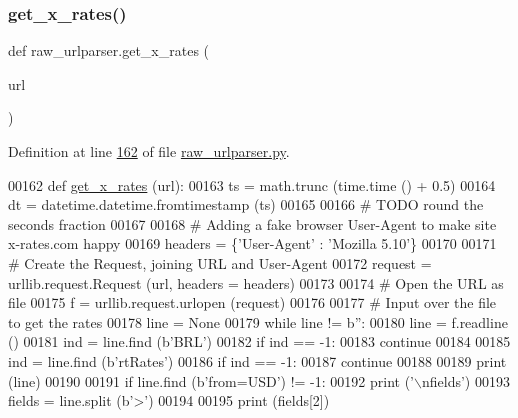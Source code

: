 \subsubsection{\texorpdfstring{get\+\_\+x\+\_\+rates()}{get\_x\_rates()}}
{\footnotesize\ttfamily def raw\+\_\+urlparser.\+get\+\_\+x\+\_\+rates (\begin{DoxyParamCaption}\item[{}]{url }\end{DoxyParamCaption})}



Definition at line \hyperlink{raw__urlparser_8py_source_l00162}{162} of file \hyperlink{raw__urlparser_8py_source}{raw\+\_\+urlparser.\+py}.


\begin{DoxyCode}
00162 \textcolor{keyword}{def }\hyperlink{namespaceraw__urlparser_ab9602b24afd1ae28d96beb085c37410e}{get\_x\_rates} (url):
00163     ts = math.trunc (time.time () + 0.5)
00164     dt = datetime.datetime.fromtimestamp (ts)
00165     
00166     \textcolor{comment}{# TODO round the seconds fraction}
00167     
00168     \textcolor{comment}{# Adding a fake browser User-Agent to make site x-rates.com happy}
00169     headers = \{\textcolor{stringliteral}{'User-Agent'} : \textcolor{stringliteral}{'Mozilla 5.10'}\}
00170         
00171     \textcolor{comment}{# Create the Request, joining URL and User-Agent}
00172     request = urllib.request.Request (url, headers = headers)
00173 
00174     \textcolor{comment}{# Open the URL as file}
00175     f = urllib.request.urlopen (request)
00176     
00177     \textcolor{comment}{# Input over the file to get the rates}
00178     line = \textcolor{keywordtype}{None}
00179     \textcolor{keywordflow}{while} line != b\textcolor{stringliteral}{''}:
00180         line = f.readline ()
00181         ind = line.find (b\textcolor{stringliteral}{'BRL'})
00182         \textcolor{keywordflow}{if} ind == -1:
00183             \textcolor{keywordflow}{continue} 
00184         
00185         ind = line.find (b\textcolor{stringliteral}{'rtRates'})
00186         \textcolor{keywordflow}{if} ind == -1:
00187             \textcolor{keywordflow}{continue} 
00188         
00189         \textcolor{keywordflow}{print} (line)
00190         
00191         \textcolor{keywordflow}{if} line.find (b\textcolor{stringliteral}{'from=USD'}) != -1:
00192             \textcolor{keywordflow}{print} (\textcolor{stringliteral}{'\(\backslash\)nfields'})
00193             fields = line.split (b\textcolor{stringliteral}{'>'})
00194             
00195             \textcolor{keywordflow}{print} (fields[2])

\end{DoxyCode}
